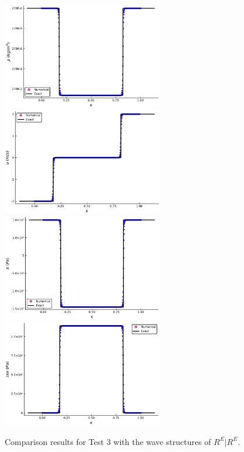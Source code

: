\documentclass[review]{elsarticle}
\numberwithin{equation}{section}
\numberwithin{table}{section}
\begin{document}
\begin{figure}[ht]
  \centering

  \includegraphics[width= 7cm] {case4rho.pdf}
  \includegraphics[width= 7cm] {case4u.pdf}
  \includegraphics[width= 7cm] {case4p.pdf}
  \includegraphics[width= 7cm] {case4sxx.pdf}

    \caption{Comparison results for Test 3 with the wave structures of $R^E|R^E$.  }
  \label{fig:case3}
\end{figure}
\end{document}
